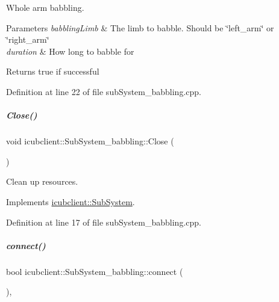 Whole arm babbling. 


\begin{DoxyParams}{Parameters}
{\em babbling\+Limb} & The limb to babble. Should be \char`\"{}left\+\_\+arm\char`\"{} or \char`\"{}right\+\_\+arm\char`\"{} \\
\hline
{\em duration} & How long to babble for \\
\hline
\end{DoxyParams}
\begin{DoxyReturn}{Returns}
true if successful 
\end{DoxyReturn}


Definition at line 22 of file sub\+System\+\_\+babbling.\+cpp.

\mbox{\label{group__icubclient__subsystems_a9865dd2f02610e3ea80923b7194981ae}} 
\subparagraph{\texorpdfstring{Close()}{Close()}}
{\footnotesize\ttfamily void icubclient\+::\+Sub\+System\+\_\+babbling\+::\+Close (\begin{DoxyParamCaption}{ }\end{DoxyParamCaption})\hspace{0.3cm}{\ttfamily [virtual]}}



Clean up resources. 



Implements \hyperlink{group__icubclient__subsystems_af327c56ad0d33aada77f825d96fb47f2}{icubclient\+::\+Sub\+System}.



Definition at line 17 of file sub\+System\+\_\+babbling.\+cpp.

\mbox{\label{group__icubclient__subsystems_a571ba8f32c2ccf03610dd06866749d95}} 
\subparagraph{\texorpdfstring{connect()}{connect()}}
{\footnotesize\ttfamily bool icubclient\+::\+Sub\+System\+\_\+babbling\+::connect (\begin{DoxyParamCaption}{ }\end{DoxyParamCaption})\hspace{0.3cm}{\ttfamily [protected]}, {\ttfamily [virtual]}}



